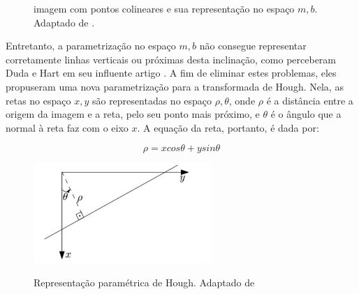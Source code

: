 \begin{figure}[h]
  \centering
  \hfill
  \caption{imagem com pontos colineares e sua representação no espaço $m,b$. Adaptado de \cite{houghintro01}.}
  \label{houghpuro}
\end{figure}

Entretanto, a parametrização no espaço $m,b$ não consegue representar corretamente linhas verticais ou próximas desta inclinação, como perceberam Duda e Hart em seu influente artigo \cite{houghintro02}. A fim de eliminar estes problemas, eles propuseram uma nova parametrização para a transformada de Hough. Nela, as retas no espaço $x,y$ são representadas no espaço $\rho,\theta$, onde $\rho$ é a distância entre a origem da imagem e a reta, pelo seu ponto mais próximo, e $\theta$ é o ângulo que a normal à reta faz com o eixo $x$. A equação da reta, portanto, é dada por: 

$$\rho = x cos \theta +y sin \theta $$ 



\begin{figure} [h]
\centering
\includegraphics[width = 0.6\textwidth]{figuras/hough.jpg} \label{hough} \caption{Representação paramétrica de Hough. Adaptado de \cite{hough00}}
\end{figure} 

